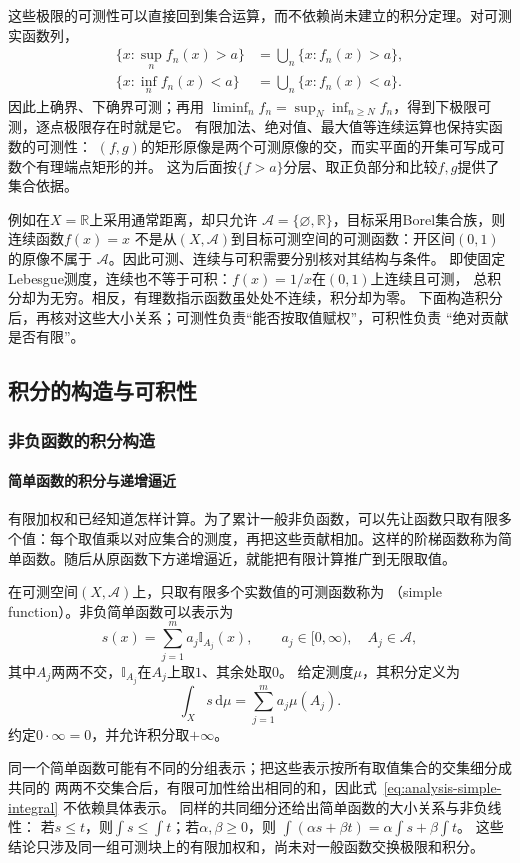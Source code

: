 这些极限的可测性可以直接回到集合运算，而不依赖尚未建立的积分定理。对可测实函数列，
\begin{align*}
 \{x:\sup_n f_n(x)>a\}&=\bigcup_n\{x:f_n(x)>a\},\\
 \{x:\inf_n f_n(x)<a\}&=\bigcup_n\{x:f_n(x)<a\}.
\end{align*}
因此上确界、下确界可测；再用
$\liminf_n f_n=\sup_N\inf_{n\geq N}f_n$，得到下极限可测，逐点极限存在时就是它。
有限加法、绝对值、最大值等连续运算也保持实函数的可测性：
$(f,g)$的矩形原像是两个可测原像的交，而实平面的开集可写成可数个有理端点矩形的并。
这为后面按$\{f>a\}$分层、取正负部分和比较$f,g$提供了集合依据。

例如在$X=\mathbb R$上采用通常距离，却只允许
$\mathcal A=\{\varnothing,\mathbb R\}$，目标采用Borel集合族，则连续函数$f(x)=x$
不是从$(X,\mathcal A)$到目标可测空间的可测函数：开区间$(0,1)$的原像不属于
$\mathcal A$。因此可测、连续与可积需要分别核对其结构与条件。
即使固定Lebesgue测度，连续也不等于可积：$f(x)=1/x$在$(0,1)$上连续且可测，
总积分却为无穷。相反，有理数指示函数虽处处不连续，积分却为零。
下面构造积分后，再核对这些大小关系；可测性负责“能否按取值赋权”，可积性负责
“绝对贡献是否有限”。

\subsection{积分的构造与可积性}
\subsubsection{非负函数的积分构造}
\paragraph{简单函数的积分与递增逼近}
有限加权和已经知道怎样计算。为了累计一般非负函数，可以先让函数只取有限多个值：每个取值乘以对应集合的测度，再把这些贡献相加。这样的阶梯函数称为简单函数。随后从原函数下方递增逼近，就能把有限计算推广到无限取值。
\begin{definition}[简单函数及其积分]
\label{def:analysis-simple-function-integral}
在可测空间$(X,\mathcal{A})$上，只取有限多个实数值的可测函数称为
（simple function）。非负简单函数可以表示为
\[   s(x)=\sum_{j=1}^{m}a_j\mathbb{I}_{A_j}(x),   \qquad a_j\in[0,\infty),\quad A_j\in\mathcal{A}, \]
其中$A_j$两两不交，$\mathbb{I}_{A_j}$在$A_j$上取$1$、其余处取$0$。
给定测度$\mu$，其积分定义为
\begin{equation}
  \int_X s\,\mathrm{d}\mu
  =
  \sum_{j=1}^{m}a_j\mu(A_j).
\label{eq:analysis-simple-integral}
\end{equation}
约定$0\cdot\infty=0$，并允许积分取$+\infty$。
\end{definition}
同一个简单函数可能有不同的分组表示；把这些表示按所有取值集合的交集细分成共同的
两两不交集合后，有限可加性给出相同的和，因此式~\eqref{eq:analysis-simple-integral}
不依赖具体表示。
同样的共同细分还给出简单函数的大小关系与非负线性：
若$s\leq t$，则$\int s\leq\int t$；若$\alpha,\beta\geq0$，则
$\int(\alpha s+\beta t)=\alpha\int s+\beta\int t$。
这些结论只涉及同一组可测块上的有限加权和，尚未对一般函数交换极限和积分。

